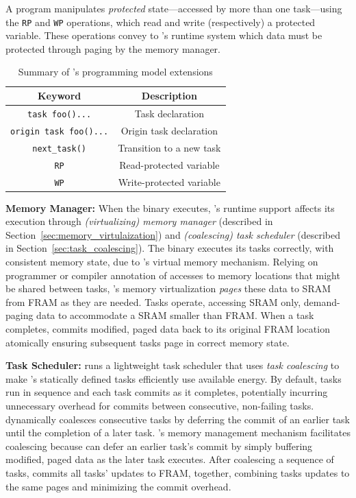 A \sys program manipulates {\em protected} state---accessed by more than one task---using the {\tt RP} and {\tt WP} operations, which read and write (respectively) a protected variable. These operations convey to \sys's runtime system which data must be protected through paging by the memory manager.   

\begin{table}
	\centering
	\footnotesize
	\begin{tabular}{|c|c|}
		\hline
		Keyword & Description\\
		\hline\hline
		\texttt{task foo(){...}} & Task declaration\\
		\texttt{origin task foo(){...}} & Origin task declaration\\
		\texttt{next\_task()} & Transition to a new task\\
		\texttt{RP} & Read-protected variable\\
		\texttt{WP} & Write-protected variable\\
		\hline
	\end{tabular}
	\caption{Summary of \sys's programming model extensions}
	\label{tab:viper_syntax}
\end{table}

\textbf{\sys Memory Manager:} When the binary executes, \sys's runtime support affects its execution through {\em (virtualizing) memory manager} (described in Section~\ref{sec:memory_virtulaization}) and {\em (coalescing) task scheduler} (described in Section~\ref{sec:task_coalescing}). The \sys binary executes its tasks correctly, with consistent memory state, due to \sys's virtual memory mechanism. Relying on programmer or compiler annotation of accesses to memory locations that might be shared between tasks, \sys's memory virtualization {\em pages} these data to SRAM from FRAM as they are needed. Tasks operate, accessing SRAM only, demand-paging data to accommodate a SRAM smaller than FRAM. When a task completes, \sys commits modified, paged data back to its original FRAM location atomically ensuring subsequent tasks page in correct memory state. 

\textbf{\sys Task Scheduler:} \sys runs a lightweight task scheduler that uses {\em task coalescing} to make \sys's statically defined tasks efficiently use available energy. By default, tasks run in sequence and each task commits as it completes, potentially incurring unnecessary overhead for commits between consecutive, non-failing tasks. \sys dynamically coalesces consecutive tasks by deferring the commit of an earlier task until the completion of a later task. \sys's memory management mechanism facilitates coalescing because \sys can defer an earlier task's commit by simply buffering modified, paged data as the later task executes. After coalescing a sequence of tasks, \sys commits all tasks' updates to FRAM, together, combining tasks updates to the same pages and minimizing the commit overhead.